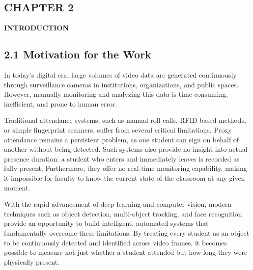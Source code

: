 \documentclass{report}
\begin{document}
\newpage
\begin{center}
    \section*{\textbf{CHAPTER 2}}
\end{center}
\begin{center}
    \textbf{\Large INTRODUCTION}\\[20pt]
\end{center}

\subsection*{2.1 Motivation for the Work}
In today's digital era, large volumes of video data are generated continuously through surveillance\vspace{3pt} cameras in institutions, organizations, and public spaces. However, manually monitoring and analyzing\vspace{3pt} this data is time-consuming, inefficient, and prone to human error.

Traditional attendance systems, such as manual roll calls, RFID-based methods, or simple fingerprint\vspace{3pt} scanners, suffer from several critical limitations. Proxy attendance remains a persistent problem, as\vspace{3pt} one student can sign on behalf of another without being detected. Such systems also provide no insight\vspace{3pt} into actual presence duration: a student who enters and immediately leaves is recorded as fully present.\vspace{3pt} Furthermore, they offer no real-time monitoring capability, making it impossible for faculty to know\vspace{3pt} the current state of the classroom at any given moment.

With the rapid advancement of deep learning and computer vision, modern techniques such as object\vspace{3pt} detection, multi-object tracking, and face recognition provide an opportunity to build intelligent,\vspace{3pt} automated systems that fundamentally overcome these limitations. By treating every student as an\vspace{3pt} object to be continuously detected and identified across video frames, it becomes possible to measure\vspace{3pt} not just whether a student attended but how long they were physically present.
\end{document}
